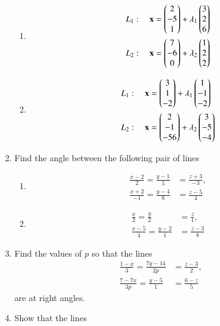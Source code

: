 \begin{enumerate}[label=\arabic*.,ref=\thesubsection.\theenumi]
\begin{enumerate}
\item
\begin{align}
L_1: \quad \mathbf{x} &= \begin{pmatrix}2\\-5\\1\end{pmatrix} + \lambda_1\begin{pmatrix}3 \\ 2 \\6\end{pmatrix}
\\
L_2: \quad \mathbf{x} &= \begin{pmatrix}7\\-6\\0\end{pmatrix} + \lambda_2\begin{pmatrix}1 \\ 2 \\2\end{pmatrix}
\end{align}
\item
\begin{align}
L_1: \quad \mathbf{x} &= \begin{pmatrix}3\\1\\-2\end{pmatrix} + \lambda_1\begin{pmatrix}1 \\ -1 \\-2\end{pmatrix}
\\
L_2: \quad \mathbf{x} &= \begin{pmatrix}2\\-1\\-56\end{pmatrix} + \lambda_2\begin{pmatrix}3 \\ -5 \\-4\end{pmatrix}
\end{align}
\end{enumerate}
\item Find the angle between the following pair of lines
\begin{enumerate}
\item 
\begin{align}
\frac{x-2}{2} = \frac{y-1}{5} &= \frac{z+3}{-3}, 
\\
\frac{x+2}{-1} = \frac{y-4}{8} &= \frac{z-5}{4} 
\end{align}
\item 
\begin{align}
\frac{x}{2} = \frac{y}{2} &= \frac{z}{1}, 
\\
\frac{x-5}{4} = \frac{y-2}{1} &= \frac{z-3}{8} 
\end{align}
\end{enumerate}
\item Find the values of $p$ so that the lines 
\begin{align}
\frac{1-x}{3} = \frac{7y-14}{2p} &= \frac{z-3}{2}, 
\\
\frac{7-7x}{3p} = \frac{y-5}{1} &= \frac{6-z}{5} 
\end{align}
are at right angles.
\item Show that the lines 

\end{enumerate}
